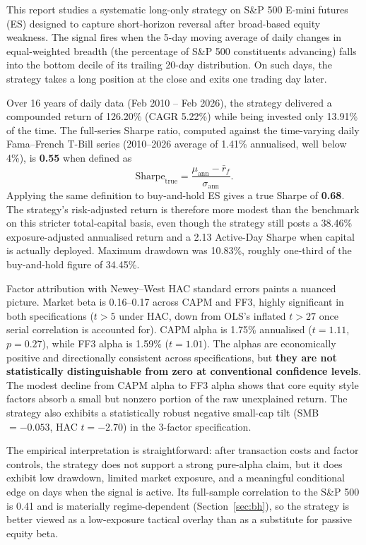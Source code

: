 \documentclass[11pt]{article}
\begin{document}
This report studies a systematic long-only strategy on S\&P 500 E-mini
futures (ES) designed to capture short-horizon reversal after broad-based
equity weakness. The signal
fires when the 5-day moving average of daily changes in equal-weighted
breadth (the percentage of S\&P 500 constituents advancing) falls into the
bottom decile of its trailing 20-day distribution. On such days, the
strategy takes a long position at the close and exits one trading day later.

Over 16 years of daily data (Feb 2010 -- Feb 2026), the strategy delivered a
compounded return of 126.20\% (CAGR 5.22\%) while being invested only
13.91\% of the time. The full-series Sharpe ratio, computed against the
time-varying daily Fama--French T-Bill series (2010--2026 average of 1.41\%
annualised, well below 4\%), is \textbf{0.55}
when defined as
\[
\mathrm{Sharpe}_{\mathrm{true}}
= \frac{\mu_{\mathrm{ann}} - \bar r_f}{\sigma_{\mathrm{ann}}}.
\]
Applying the same definition to buy-and-hold ES gives a true
Sharpe of \textbf{0.68}. The strategy's risk-adjusted return is therefore
more modest than the benchmark on this stricter total-capital basis, even
though the strategy still posts a 38.46\% exposure-adjusted annualised return
and a 2.13 Active-Day Sharpe when capital is actually deployed. Maximum
drawdown was 10.83\%, roughly one-third of the buy-and-hold figure of
34.45\%.

Factor attribution with Newey--West HAC standard errors paints a nuanced
picture. Market beta is 0.16--0.17 across CAPM and FF3, highly
significant in both specifications ($t > 5$ under HAC, down from OLS's
inflated $t > 27$ once serial correlation is accounted for). CAPM alpha is
1.75\% annualised ($t = 1.11$, $p = 0.27$), while FF3 alpha is 1.59\%
($t = 1.01$). The alphas are economically positive and directionally
consistent across specifications, but \textbf{they are not statistically
distinguishable from zero at conventional confidence levels}. The modest
decline from CAPM alpha to FF3 alpha shows that core equity style factors
absorb a small but nonzero portion of the raw unexplained return. The
strategy also exhibits a statistically robust negative small-cap tilt
(SMB $=-0.053$, HAC $t = -2.70$) in the 3-factor specification.

The empirical interpretation is straightforward: after transaction costs
and factor controls, the strategy does not support a strong pure-alpha
claim, but it does exhibit low drawdown, limited market exposure, and a
meaningful conditional edge on days when the signal is active. Its
full-sample correlation to the S\&P 500 is 0.41 and is materially
regime-dependent (Section~\ref{sec:bh}), so the strategy is better viewed
as a low-exposure tactical overlay than as a substitute for passive equity
beta.
\end{document}
